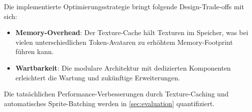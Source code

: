 Die implementierte Optimierungsstrategie bringt folgende Design-Trade-offs mit sich:

\begin{itemize}
	\item \textbf{Memory-Overhead}: Der Texture-Cache hält Texturen im Speicher, was bei vielen unterschiedlichen Token-Avataren zu erhöhtem Memory-Footprint führen kann.
	\item \textbf{Wartbarkeit}: Die modulare Architektur mit dedizierten Komponenten erleichtert die Wartung und zukünftige Erweiterungen.
\end{itemize}

Die tatsächlichen Performance-Verbesserungen durch Texture-Caching und automatisches Sprite-Batching werden in \autoref{sec:evaluation} quantifiziert.
